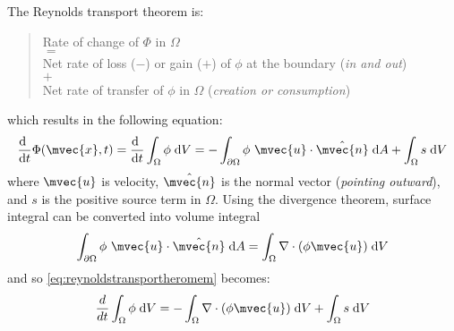The Reynolds transport theorem is:
\begin{quote}
	\centering
	Rate of change of $\Phi$ in $\Omega$\\
	$=$\\
	Net rate of loss ($-$) or gain ($+$) of $\phi$ at the boundary (\textit{in and out})\\
	$+$\\
	Net rate of transfer of $\phi$ in $\Omega$ (\textit{creation or consumption})
\end{quote}
which results in the following equation:
\begin{equation}
\frac{\mathrm{d}~}{\mathrm{d}t} \Phi (\mvec{x},t) = \frac{\mathrm{d}~}{\mathrm{d}t}\int_{\Omega} \phi\;\mathrm{d}V = -\int_{\partial\Omega} \phi~\mvec{u}\cdot\hat{\mvec{n}}\;\mathrm{d}A + \int_{\Omega} s\;\mathrm{d}V
\label{eq:reynoldstransportheromem}
\end{equation}
where $\mvec{u}$ is velocity, $\hat{\mvec{n}}$ is the normal vector (\textit{pointing outward}), and $s$ is the positive source term in $\Omega$. Using the divergence theorem,  surface integral can be converted into volume integral
\begin{equation}
\int_{\partial\Omega} \phi~\mvec{u}\cdot\hat{\mvec{n}}\;\mathrm{d}A = \int_{\Omega} \nabla \cdot (\phi\mvec{u})\;\mathrm{d}V
\end{equation}
and so \ref{eq:reynoldstransportheromem} becomes:
\begin{equation}
\frac{d}{dt}\int_{\Omega} \phi\;\mathrm{d}V = -\int_{\Omega} \nabla \cdot (\phi\mvec{u})\;\mathrm{d}V + \int_{\Omega} s\;\mathrm{d}V
\end{equation}

